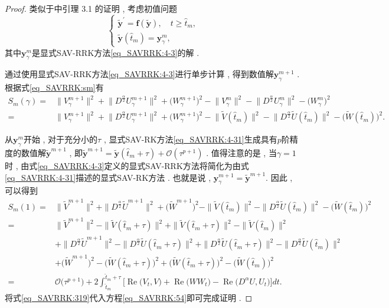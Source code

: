 \begin{proof}
类似于\citep{liImplicitexplicitRelaxationRungeKutta2022}中引理 3.1 的证明 , 
考虑初值问题
\begin{equation}
\left\{\begin{array}{l}
\tilde{\bm{y}}^{\prime}=\bm{f}(\tilde{\bm{y}}) , \quad t \geq \hat{t}_m , \\
\tilde{\bm{y}}\left(\hat{t}_m\right)=\bm{y}_\gamma^m , 
\end{array}\right . 
\end{equation}
其中$\bm{y}_\gamma^m$是显式SAV-RRK方法\eqref{eq_SAVRRK:4-3}的解 . 

通过使用显式SAV-RRK方法\eqref{eq_SAVRRK:4-3}进行单步计算 , 得到数值解$\bm{y}_\gamma^{m+1}$ . 根据式\eqref{eq_SAVRRK:sm}有
\begin{equation}
\begin{aligned}
S_m(\gamma) \!=& \|V_\gamma^{m+1}\|^2 \!+\! \|D^\frac{\alpha}{2} U_\gamma^{m+1}\|^2\!+\!\big(W_\gamma^{m+1}\big)^2\!-\!\|V_\gamma^{m}\|^2 \!-\! \|D^\frac{\alpha}{2} U_\gamma^{m}\|^2\!-\!\big(W_\gamma^{m}\big)^2\\
\!=& \|V_\gamma^{m+1}\|^2 \!+\! \|D^\frac{\alpha}{2} U_\gamma^{m+1}\|^2\!+\!\big(W_\gamma^{m+1}\big)^2\!-\!\|\tilde{V}(\hat{t}_{m})\|^2 \!-\! \|D^\frac{\alpha}{2} \tilde{U}(\hat{t}_{m})\|^2\!-\!\big(\tilde{W}(\hat{t}_{m})\big)^2 . 
\end{aligned}
\end{equation}

从$\bm{y}_\gamma^m$开始 , 对于充分小的$\tau$ , 显式SAV-RK方法\eqref{eq_SAVRRK:4-31}生成具有$p$阶精度的数值解$\tilde{\bm{y}}^{m+1}$ , 
即$\tilde{\bm{y}}^{m+1}=\tilde{\bm{y}}\left(\hat{t}_m+\tau\right)+\mathcal{O}\left(\tau^{p+1}\right)$ . 
值得注意的是 , 当$\gamma=1$时 , 由式\eqref{eq_SAVRRK:4-3}定义的显式SAV-RRK方法将简化为由式\eqref{eq_SAVRRK:4-31}描述的显式SAV-RK方法 . 也就是说 , $\bm{y}_\gamma^{m +1}=\tilde{\bm{y}}^{m +1} .$ 因此 , 可以得到
\begin{align}
S_m(1) = &\|\tilde{V}^{m+1}\|^2 + \|D^\frac{\alpha}{2} \tilde{U}^{m+1}\|^2+\big(\tilde{W}^{m+1}\big)^2-\|\tilde{V}(\hat{t}_{m})\|^2-\|D^\frac{\alpha}{2} \tilde{U}(\hat{t}_{m})\|^2-\big(\tilde{W}(\hat{t}_{m})\big)^2 \nonumber\\
= &\|\tilde{V}^{m+1}\|^2 -\|\tilde{V}(\hat{t}_{m}+\tau)\|^2 +\|\tilde{V}(\hat{t}_{m}+\tau)\|^2-\|\tilde{V}(\hat{t}_{m})\|^2\nonumber\\
& + \|D^\frac{\alpha}{2} \tilde{U}^{m+1}\|^2 -\|D^\frac{\alpha}{2} \tilde{U}(\hat{t}_{m}+\tau)\|^2+\|D^\frac{\alpha}{2} \tilde{U}(\hat{t}_{m}+\tau)\|^2- \|D^\frac{\alpha}{2} \tilde{U}(\hat{t}_{m})\|^2\nonumber\\
& +\big(\tilde{W}^{m+1}\big)^2 -\big(\tilde{W}(\hat{t}_{m}+\tau)\big)^2+\big(\tilde{W}(\hat{t}_{m}+\tau)\big)^2-\big(\tilde{W}(\hat{t}_{m})\big)^2 \nonumber\\
= &\mathcal{O}\big(\tau^{p+1}\big) +2\int_{\hat{t}_m}^{\hat{t}_m+\tau}\big[\operatorname{Re}\big(V_t , V\big) + \operatorname{Re}\big(W W_t\big)-\operatorname{Re}\big(D^{\alpha} U , U_t\big)\big]dt . \label{eq_SAVRRK:54}
\end{align}
将式\eqref{eq_SAVRRK:319}代入方程\eqref{eq_SAVRRK:54}即可完成证明 . 


\end{proof}

